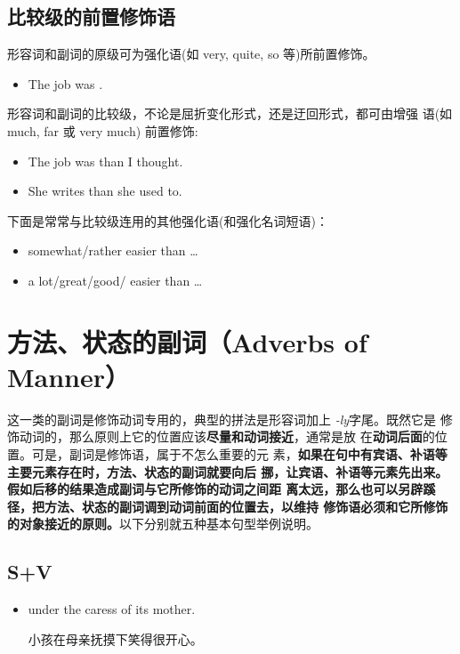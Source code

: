 \subsection{比较级的前置修饰语}

形容词和副词的原级可为强化语(如 very, quite, so 等)所前置修饰。
\begin{itemize}
\item The job was .
\end{itemize}

形容词和副词的比较级，不论是屈折变化形式，还是迂回形式，都可由增强
语(如 much, far 或 very much) 前置修饰:
\begin{itemize}
\item The job was  than I thought.
\item She writes  than she used to.
\end{itemize}

下面是常常与比较级连用的其他强化语(和强化名词短语)：
\begin{itemize}
\item somewhat/rather easier than \ldots{}
\item a lot/great/good/ easier than \ldots{}
\end{itemize}

\section{方法、状态的副词（Adverbs of Manner）}

这一类的副词是修饰动词专用的，典型的拼法是形容词加上 \emph{-ly}字尾。既然它是
修饰动词的，那么原则上它的位置应该\textbf{尽量和动词接近}，通常是放
在\textbf{动词后面}的位置。可是，副词是修饰语，属于不怎么重要的元
素，\textbf{如果在句中有宾语、补语等主要元素存在时，方法、状态的副词就要向后
  挪，让宾语、补语等元素先出来。假如后移的结果造成副词与它所修饰的动词之间距
  离太远，那么也可以另辟蹊径，把方法、状态的副词调到动词前面的位置去，以维持
  修饰语必须和它所修饰的对象接近的原则。}以下分别就五种基本句型举例说明。

\subsection{S+V}

\begin{itemize}
\item  {}   under the caress of its mother.

  小孩在母亲抚摸下笑得很开心。
\end{itemize}

